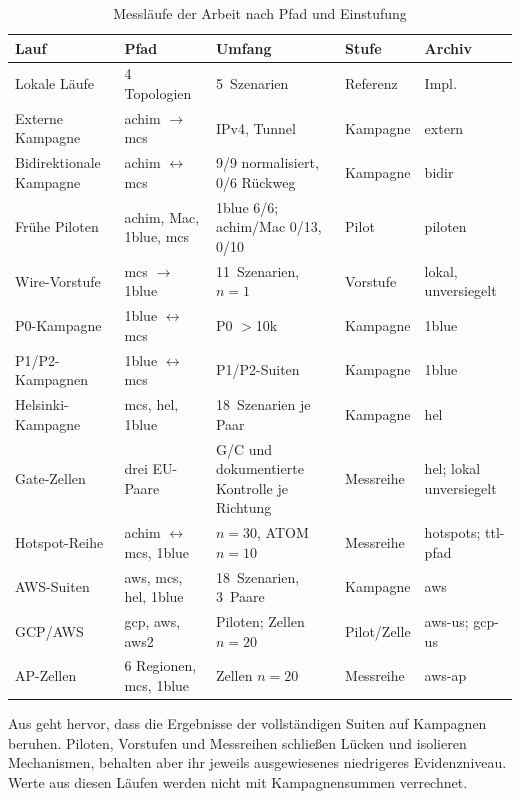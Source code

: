 \begin{table}[ht]
    \centering
    \caption{Messläufe der Arbeit nach Pfad und Einstufung}
    \label{tab:eval-messlaeufe}
    \footnotesize
    \setlength{\tabcolsep}{3.5pt}
    \begin{tabularx}{\textwidth}{L{2.20cm} L{2.35cm} Y L{2.05cm} L{1.40cm}}
        \toprule
        \textbf{Lauf} & \textbf{Pfad} & \textbf{Umfang} & \textbf{Stufe} &
        \textbf{Archiv} \\
        \midrule
        Lokale Läufe & 4 Topologien & 5~Szenarien & Referenz & Impl. \\
        Externe Kampagne & achim $\rightarrow$ mcs & IPv4, Tunnel & Kampagne & extern \\
        Bidirektionale Kampagne & achim $\leftrightarrow$ mcs & 9/9 normalisiert, 0/6 Rückweg & Kampagne & bidir \\
        Frühe Piloten & achim, Mac, 1blue, mcs & 1blue 6/6; achim/Mac 0/13, 0/10 & Pilot & piloten \\
        Wire-Vorstufe & mcs $\rightarrow$ 1blue & 11~Szenarien, $n=1$ & Vorstufe & lokal, unversiegelt \\
        P0-Kampagne & 1blue $\leftrightarrow$ mcs & P0 $>$10k & Kampagne & 1blue \\
        P1/P2-Kampagnen & 1blue $\leftrightarrow$ mcs & P1/P2-Suiten & Kampagne & 1blue \\
        Helsinki-Kampagne & mcs, hel, 1blue & 18~Szenarien je Paar & Kampagne & hel \\
        Gate-Zellen & drei EU-Paare & G/C und dokumentierte Kontrolle je         Richtung & Messreihe & hel;
        lokal unversiegelt \\
        Hotspot-Reihe & achim $\leftrightarrow$ mcs, 1blue & $n=30$, ATOM $n=10$ & Messreihe & hotspots; ttl-pfad \\
        AWS-Suiten & aws, mcs, hel, 1blue & 18~Szenarien, 3~Paare & Kampagne & aws \\
        GCP/AWS & gcp, aws, aws2 & Piloten; Zellen $n=20$ & Pilot/Zelle & aws-us; gcp-us \\
        AP-Zellen & 6 Regionen, mcs, 1blue & Zellen $n=20$ & Messreihe & aws-ap \\
        \bottomrule
    \end{tabularx}
\end{table}

Aus  geht hervor, dass die Ergebnisse der vollständigen Suiten auf Kampagnen
beruhen. Piloten, Vorstufen und Messreihen schließen Lücken und isolieren Mechanismen, behalten aber ihr
jeweils ausgewiesenes niedrigeres Evidenzniveau. Werte aus diesen Läufen werden nicht mit
Kampagnensummen verrechnet.

